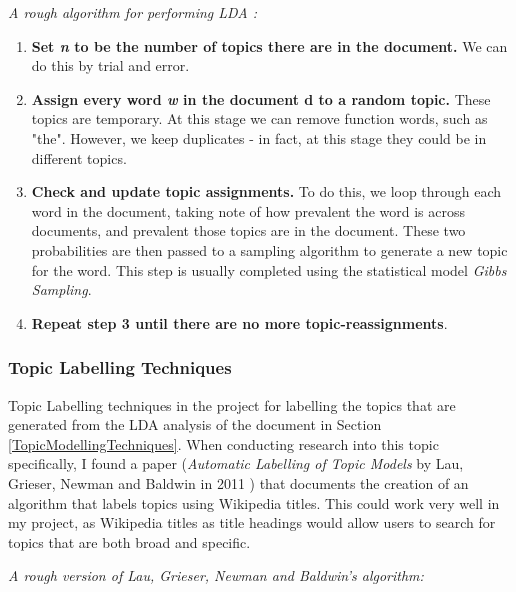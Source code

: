 \documentclass[12pt]{article}
\begin{document}
\emph{A rough algorithm for performing LDA \cite{ldaExplanation}:}

\begin{enumerate}
	\item \textbf{Set \emph{n} to be the number of topics there are in the document.} We can do this by trial and error. 
	\item \textbf{Assign every word \emph{w} in the document {d} to a random topic.} These topics are temporary. At this stage we can remove function words, such as "the". However, we keep duplicates - in fact, at this stage they could be in different topics. 
	\item \textbf{Check and update topic assignments.} To do this, we loop through each word in the document, taking note of how prevalent the word is across documents, and prevalent those topics are in the document. These two probabilities are then passed to a sampling algorithm to generate a new topic for the word. This step is usually completed using the statistical model \emph{Gibbs Sampling}.
	\item \textbf{Repeat step 3 until there are no more topic-reassignments}. 
\end{enumerate}

\subsubsection{Topic Labelling Techniques}

Topic Labelling techniques in the project for labelling the topics that are generated from the LDA analysis of the document in Section \ref{TopicModellingTechniques}. When conducting research into this topic specifically, I found a paper (\emph{Automatic Labelling of Topic Models} by Lau, Grieser, Newman and Baldwin in 2011 \cite{topicLabelling}) that documents the creation of an algorithm that labels topics using Wikipedia \cite{wikipedia} titles. This could work very well in my project, as Wikipedia titles as title headings would allow users to search for topics that are both broad and specific. 

\emph{A rough version of Lau, Grieser, Newman and Baldwin's algorithm:}

\label{labellingalgorithm}
\end{document}
